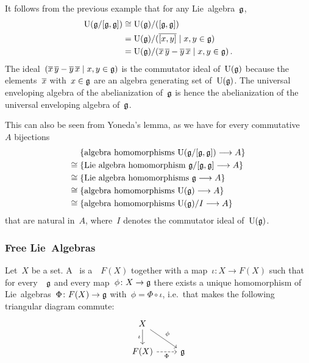 \begin{example}
  It follows from the previous example that for any Lie~algebra~$\mathfrak{g}$,
  \begin{align*}
    \Univ(\glie/[\glie, \glie])
    &\cong
    \Univ(\glie) / ([\glie, \glie])
    \\
    &=
    \Univ(\glie)
    /
    (\class{[x,y]} \suchthat x, y \in \glie)
    \\
    &=
    \Univ(\glie)
    /
    (
      \class{x} \, \class{y} - \class{y} \, \class{x} 
    \suchthat
      x, y \in \glie
    ) \,.
  \end{align*}
  The ideal~$(\class{x} \, \class{y} - \class{y} \, \class{x} \suchthat x, y \in \glie)$ is the commutator ideal of~$\operatorname{U}(\mathfrak{g})$ because the elements~$\overline{x}$ with~$x \in \mathfrak{g}$ are an algebra generating set of~$\operatorname{U}(\mathfrak{g})$.
  The universal enveloping algebra of the abelianization of~$\mathfrak{g}$ is hence the abelianization of the universal enveloping algebra of~$\mathfrak{g}$.
  
  This can also be seen from Yoneda’s lemma, as we have for every commutative~{\algebra{$\kf$}}~$A$ bijections
  \begin{align*}
    {}&
    \{ \text{algebra homomorphisms~$\Univ(\glie/[\glie,\glie]) \to A$} \}
    \\
    \cong{}&
    \{ \text{Lie~algebra homomorphism~$\glie/[\glie, \glie] \to A$} \}
    \\
    \cong{}&
    \{ \text{Lie~algebra homomorphisms~$\glie \to A$} \}
    \\
    \cong{}&
    \{ \text{algebra homomorphisms~$\Univ(\glie) \to A$} \}
    \\
    \cong{}&
    \{ \text{algebra homomorphisms~$\Univ(\glie)/I \to A$} \}
  \end{align*}
  that are natural in~$A$, where~$I$ denotes the commutator ideal of~$\operatorname{U}(\mathfrak{g})$.
\end{example}





\subsubsection{Free Lie~Algebras}


\begin{definition}
  Let~$X$ be a set.
  A~ is a~{\liealgebra{$\kf$}}~$F(X)$ together with a map~$\iota \colon X \to F(X)$ such that for every~{\liealgebra{$\kf$}}~$\mathfrak{g}$ and every map~$\phi \colon X \to \glie$ there exists a unique homomorphism of Lie~algebras~$\Phi \colon F(X) \to \glie$ with~$\phi = \Phi \circ \iota$, i.e.\ that makes the following triangular diagram commute:
  \[
    \begin{tikzcd}
      X
      \arrow{dr}[above right]{\phi}
      \arrow{d}[left]{\iota}
      &
      {}
      \\
      F(X)
      \arrow[dashed]{r}[below]{\Phi}
      &
      \glie
    \end{tikzcd}
  \]
\end{definition}



